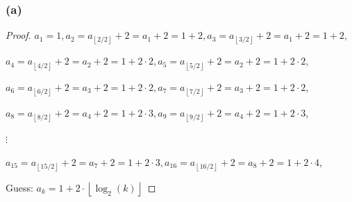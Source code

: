 \documentclass[14pt]{extarticle}
\newcommand{\floor}[1]{{\left\lfloor#1\right\rfloor}}
\begin{document}
\subsubsection{(a)}
\begin{proof}
\(a_1 = 1, a_2 = a_{\floor{2/2}} + 2 = a_1 + 2 = 1 + 2, a_3 = a_{\floor{3/2}} + 2 = a_1 + 2 = 1 + 2,\)

\(a_4 = a_{\floor{4/2}} + 2 = a_2 + 2 = 1 + 2 \cdot 2, a_5 = a_{\floor{5/2}} + 2 = a_2 + 2 = 1 + 2 \cdot 2\),

\(a_6 = a_{\floor{6/2}} + 2 = a_3 + 2 = 1 + 2 \cdot 2, a_7 = a_{\floor{7/2}} + 2 = a_3 + 2 = 1 + 2 \cdot 2\),

\(a_8 = a_{\floor{8/2}} + 2 = a_4 + 2 = 1 + 2 \cdot 3, a_9 = a_{\floor{9/2}} + 2 = a_4 + 2 = 1 + 2 \cdot 3\),

\(\vdots\)

\(a_{15} = a_{\floor{15/2}} + 2 = a_7 + 2 = 1 + 2 \cdot 3, a_{16} = a_{\floor{16/2}} + 2 = a_8 + 2 = 1 + 2 \cdot 4\),

Guess: \(a_k = 1 + 2 \cdot \floor{\log_2(k)}\)
\end{proof}
\end{document}

